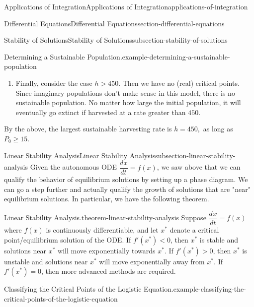\documentclass[oneside,10pt,]{book}
\newcommand{\terminology}[1]{\textbf{#1}}
\numberwithin{equation}{section}
\newcommand{\dv}[3][]{\dfrac{d^{#1} #2}{d #3^{#1}}}
\newcommand{\lt}{<}
\newcommand{\gt}{>}
\begin{document}
\begin{chapterptx}{Applications of Integration}{}{Applications of Integration}{}{}{applications-of-integration}
\begin{sectionptx}{Differential Equations}{}{Differential Equations}{}{}{section-differential-equations}
\begin{subsectionptx}{Stability of Solutions}{}{Stability of Solutions}{}{}{subsection-stability-of-solutions}
\begin{example}{Determining a Sustainable Population.}{example-determining-a-sustainable-population}
\begin{enumerate}
\begin{figure}
{
}
\end{figure}
\hypertarget{p-766}{}%
We interpret the phase diagram as follows: if \(P\) is less than \hypertarget{p-767}{}%
15,000%
 then the population will collapse to extinction. Otherwise, the population will stabilize at \(15,000\). This type of critical point is often called \terminology{semi-stable.}%
\item\hypertarget{li-67}{}\hypertarget{p-768}{}%
Finally, consider the case \(h \gt 450\). Then we have no (real) critical points. Since imaginary populations don't make sense in this model, there is no sustainable population. No matter how large the initial population, it will eventually go extinct if harvested at a rate greater than \(450\).%
\end{enumerate}
\hypertarget{p-769}{}%
By the above, the largest sustainable harvesting rate is \(h = 450,\) as long as \(P_{0}\geq 15\).%
\end{example}
\end{subsectionptx}
%
%
\typeout{************************************************}
\typeout{************************************************}
%
\begin{subsectionptx}{Linear Stability Analysis}{}{Linear Stability Analysis}{}{}{subsection-linear-stability-analysis}
\hypertarget{p-770}{}%
Given the autonomous ODE \(\dv{x}{t} = f(x)\), we saw above that we can qualify the behavior of equilibrium solutions by setting up a phase diagram. We can go a step further and actually qualify the growth of solutions that are "near" equilibrium solutions. In particular, we have the following theorem.%
\begin{theorem}{Linear Stability Analysis.}{}{theorem-linear-stability-analysis}%
\hypertarget{p-771}{}%
Suppose \(\dv{x}{t} = f(x)\) where \(f(x)\) is continuously differentiable, and let \(x^{*}\) denote a critical point\slash{}equilibrium solution of the ODE. If \(f'(x^{*}) \lt 0\), then \(x^{*}\) is stable and solutions near \(x^{*}\) will move exponentially towards \(x^{*}\). If \(f'(x^{*}) \gt 0\), then \(x^{*}\) is unstable and solutions near \(x^{*}\) will move exponentially away from \(x^{*}\). If \(f'(x^{*}) = 0\), then more advanced methods are required.%
\end{theorem}
\begin{example}{Classifying the Critical Points of the Logistic Equation.}{example-classifying-the-critical-points-of-the-logistic-equation}%

\end{example}
\end{subsectionptx}
\end{sectionptx}
\end{chapterptx}
\end{document}
